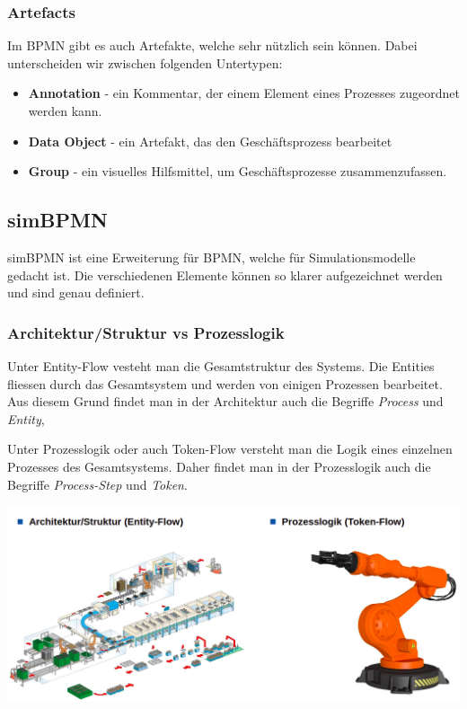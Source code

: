 \subsubsection{Artefacts}
Im BPMN gibt es auch Artefakte, welche sehr nützlich sein können. Dabei unterscheiden wir zwischen folgenden Untertypen:
\begin{itemize}
    \item \textbf{Annotation} - ein Kommentar, der einem Element eines Prozesses zugeordnet werden kann. 
    \item \textbf{Data Object} - ein Artefakt, das den Geschäftsprozess bearbeitet
    \item \textbf{Group} - ein visuelles Hilfsmittel, um Geschäftsprozesse zusammenzufassen.  
\end{itemize}

\subsection{simBPMN}
simBPMN ist eine Erweiterung für BPMN, welche für Simulationsmodelle gedacht ist. Die verschiedenen Elemente können so klarer aufgezeichnet werden und sind genau definiert.

\subsubsection{Architektur/Struktur vs Prozesslogik}
Unter Entity-Flow vesteht man die Gesamtstruktur des Systems. Die Entities fliessen durch das Gesamtsystem und werden von einigen Prozessen bearbeitet. Aus diesem Grund findet man in der Architektur auch die Begriffe  \textit{Process} und \textit{Entity},

Unter Prozesslogik oder auch Token-Flow versteht man die Logik eines einzelnen Prozesses des Gesamtsystems. Daher findet man in der Prozesslogik auch die Begriffe \textit{Process-Step} und \textit{Token}.

\begin{minipage}[t]{1\textwidth}
    \centering
	\includegraphics[width=0.8\linewidth]{images/simBPMN_architektur_vs_prozesslogik.png}
\end{minipage}


